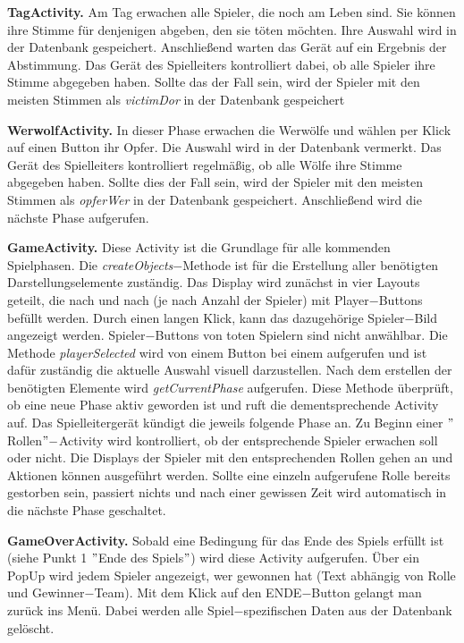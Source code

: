 \documentclass[12pt]{article}
\begin{document}
\textbf{TagActivity.}
Am Tag erwachen alle Spieler, die noch am Leben sind. 
Sie können ihre Stimme für denjenigen abgeben, den sie töten möchten. Ihre Auswahl wird in der Datenbank
gespeichert. Anschließend warten das Gerät auf ein Ergebnis der Abstimmung.
Das Gerät des Spielleiters kontrolliert dabei, ob alle Spieler ihre Stimme abgegeben haben.
Sollte das der Fall sein, wird der Spieler mit den meisten Stimmen als \textit{victimDor} in der Datenbank
gespeichert      

\vspace{0,3 cm}

\textbf{WerwolfActivity.}
In dieser Phase erwachen die Werwölfe und wählen per Klick auf einen Button ihr Opfer.
Die Auswahl wird in der Datenbank vermerkt. Das Gerät des Spielleiters kontrolliert regelmäßig,
ob alle Wölfe ihre Stimme abgegeben haben. Sollte dies der Fall sein, wird der Spieler mit den meisten
Stimmen als \textit{opferWer} in der Datenbank gespeichert.
Anschließend wird die nächste Phase aufgerufen.

\vspace{0,3 cm}

\textbf{GameActivity.}
Diese Activity ist die Grundlage für alle kommenden Spielphasen. Die \textit{createObjects}$-$Methode ist für die Erstellung aller benötigten Darstellungselemente zuständig. Das Display wird zunächst in vier Layouts geteilt, die nach und nach (je nach Anzahl der Spieler) mit Player$-$Buttons befüllt werden. Durch einen langen Klick, kann das dazugehörige Spieler$-$Bild angezeigt werden. Spieler$-$Buttons von toten Spielern sind nicht anwählbar.
Die Methode \textit{playerSelected} wird von einem Button bei einem aufgerufen und ist dafür zuständig die aktuelle Auswahl visuell darzustellen.
Nach dem erstellen der benötigten Elemente wird \textit{getCurrentPhase} aufgerufen. Diese Methode überprüft, ob eine neue Phase aktiv geworden ist und ruft die dementsprechende Activity auf. Das Spielleitergerät kündigt die jeweils folgende Phase an.
Zu Beginn einer $"$Rollen$"-$Activity wird kontrolliert, ob der entsprechende Spieler erwachen soll oder nicht. Die Displays der Spieler mit den entsprechenden Rollen gehen an und Aktionen können ausgeführt werden.
Sollte eine einzeln aufgerufene Rolle bereits gestorben sein, passiert nichts und nach einer
gewissen Zeit wird automatisch in die nächste Phase geschaltet.

\vspace{0,3 cm}
            
\textbf{GameOverActivity.}
Sobald eine Bedingung für das Ende des Spiels erfüllt ist (siehe Punkt 1 $"$Ende des Spiels$"$) wird diese Activity aufgerufen.
Über ein PopUp wird jedem Spieler angezeigt, wer gewonnen hat (Text abhängig von Rolle und Gewinner$-$Team).
Mit dem Klick auf den ENDE$-$Button gelangt man zurück ins Menü. Dabei werden alle Spiel$-$spezifischen Daten aus der Datenbank gelöscht.
\end{document}
